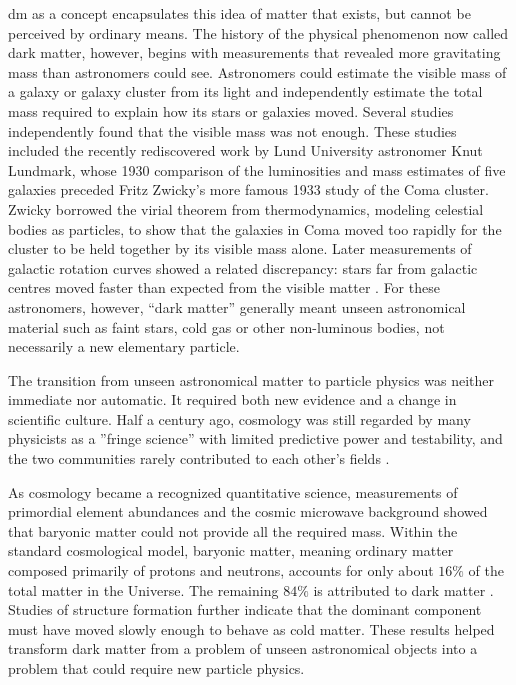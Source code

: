 \gls{dm} as a concept encapsulates this idea of matter that exists, but cannot
be perceived by ordinary means. The history of the physical phenomenon now
called dark matter, however, begins with measurements that revealed more
gravitating mass than astronomers could see. Astronomers could estimate the
visible mass of a galaxy or galaxy cluster from its light and independently
estimate the total mass required to explain how its stars or galaxies moved.
Several studies independently found that the visible mass was not enough. 
These studies included the recently rediscovered work by Lund University astronomer Knut Lundmark, whose
1930 comparison of the luminosities and mass estimates of five galaxies
preceded Fritz Zwicky's more famous 1933 study of the Coma cluster. Zwicky borrowed
the virial theorem from thermodynamics, modeling celestial bodies as particles, to show that the galaxies in Coma moved too rapidly for the
cluster to be held together by its visible mass alone.
Later measurements of galactic rotation curves showed a related
discrepancy: stars far from galactic centres moved faster than expected from the
visible matter
\cite{lundmark1930-galaxy-masses,bertone2016-history-dark-matter,
orodruin2016-lundmark-darkmatter}. For these astronomers, however, ``dark
matter'' generally meant unseen astronomical material such as faint stars, cold
gas or other non-luminous bodies, not necessarily a new elementary particle.

The transition from unseen astronomical matter to particle physics was neither
immediate nor automatic. It required both new evidence and a change in
scientific culture. Half a century ago, cosmology was still regarded by many physicists as a ''fringe science'' with limited predictive
power and testability, and the two communities rarely contributed to each
other's fields \cite{bertone2016-history-dark-matter}.

As cosmology became a recognized quantitative science, measurements of primordial element
abundances and the cosmic microwave background showed that baryonic
matter could not provide all the required mass. Within the standard
cosmological model, baryonic matter, meaning ordinary matter composed primarily
of protons and neutrons, accounts for only about \(16\%\) of the total matter
in the Universe. The remaining \(84\%\) is attributed to dark matter
\cite{cirelli2026-darkmatter}. Studies of structure formation further indicate
that the dominant component must have moved slowly enough to behave as cold matter. These results helped transform dark matter from a problem of unseen
astronomical objects into a problem that could require new particle physics.

